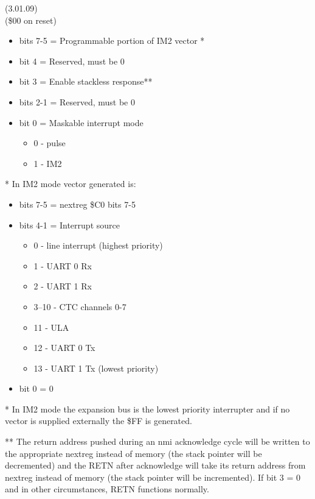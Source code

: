  (3.01.09)\\
(\$00 on reset)
\begin{itemize}
\item bits 7-5 = Programmable portion of IM2 vector *
\item bit 4 = Reserved, must be 0
\item bit 3 = Enable stackless  response**
\item bits 2-1 = Reserved, must be 0
\item bit 0 = Maskable interrupt mode
\begin{itemize}
\item[] 0 - pulse
\item[] 1 - IM2
\end{itemize}
\end{itemize}
* In IM2 mode vector generated is:
\begin{itemize}
\item bits 7-5 = nextreg \$C0 bits 7-5
\item bits 4-1 = Interrupt source
\begin{itemize}
\item[] 0 - line interrupt (highest priority)
\item[] 1 - UART 0 Rx
\item[] 2 - UART 1 Rx
\item[] 3--10 - CTC channels 0-7
\item[] 11 - ULA
\item[] 12 - UART 0 Tx
\item[] 13 - UART 1 Tx (lowest priority)
\end{itemize}
\item bit 0 = 0
\end{itemize}

* In IM2 mode the expansion bus is the lowest priority interrupter and
  if no vector is supplied externally the \$FF is generated.

** The return address pushed during an nmi acknowledge cycle will be
   written to the appropriate nextreg instead of memory (the stack
   pointer will be decremented) and the RETN after acknowledge will
   take its return address from nextreg instead of memory (the stack
   pointer will be incremented). If bit 3 = 0 and in other
   circumstances, RETN functions normally.


